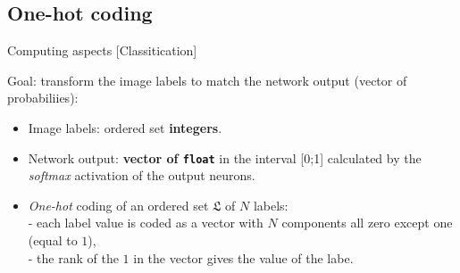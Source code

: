 \documentclass[10pt,serif,mathserif,compress,hyperref={colorlinks}]{beamer}
\begin{document}
\subsection{One-hot coding}

\begin{frame}{Computing aspects [Classitication]}

\begin{tcolorbox}[title={\em One-hot} coding of labels]

     Goal: transform the image labels to match the network output (vector of probabiliies):

     {\small
       \begin{itemize}
       \item Image labels: ordered set \textbf{integers}.
       \item Network output: \textbf{vector of \texttt{float}} in the interval [0;1] calculated by the {\em softmax} activation of the output neurons.
       \item {\em One-hot} coding of an ordered set $\mathfrak{L}$ of $N$ labels: \\[1mm]
         - each label value is coded as a vector with $N$ components all zero except one (equal to $1$),\\
         - the rank of the $1$ in the vector gives the value of the labe.
       \end{itemize}
     }
\end{tcolorbox}


\end{frame}
\end{document}
